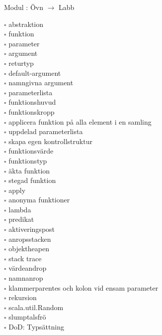 
    Modul : Övn  $\rightarrow$ Labb 
    \begin{multicols}{3}\SlideFontTiny
    $\square$ abstraktion \\
$\square$ funktion \\
$\square$ parameter \\
$\square$ argument \\
$\square$ returtyp \\
$\square$ default-argument \\
$\square$ namngivna argument \\
$\square$ parameterlista \\
$\square$ funktionshuvud \\
$\square$ funktionskropp \\
$\square$ applicera funktion på alla element i en samling \\
$\square$ uppdelad parameterlista \\
$\square$ skapa egen kontrollstruktur \\
$\square$ funktionsvärde \\
$\square$ funktionstyp \\
$\square$ äkta funktion \\
$\square$ stegad funktion \\
$\square$ apply \\
$\square$ anonyma funktioner \\
$\square$ lambda \\
$\square$ predikat \\
$\square$ aktiveringspost \\
$\square$ anropsstacken \\
$\square$ objektheapen \\
$\square$ stack trace \\
$\square$ värdeandrop \\
$\square$ namnanrop \\
$\square$ klammerparentes och kolon vid ensam parameter \\
$\square$ rekursion \\
$\square$ scala.util.Random \\
$\square$ slumptalsfrö \\
$\square$ DoD: Typsättning \\
    \end{multicols}
    